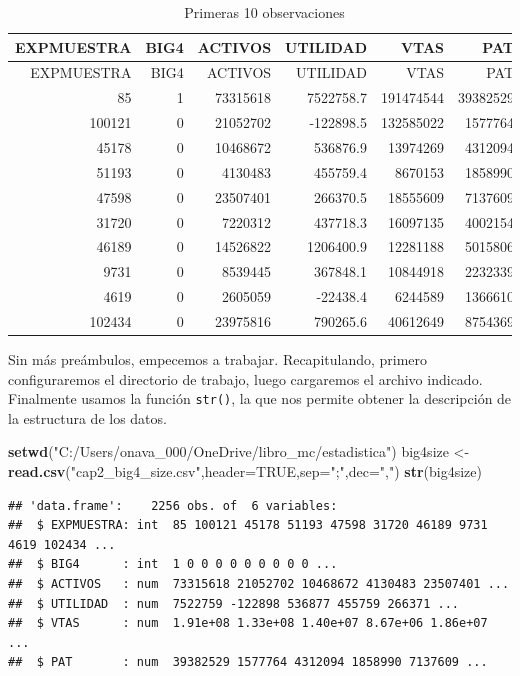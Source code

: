 \documentclass[]{book}
\newenvironment{Shaded}{\begin{snugshade}}{\end{snugshade}}
\newcommand{\KeywordTok}[1]{\textcolor[rgb]{0.13,0.29,0.53}{\textbf{#1}}}
\newcommand{\DataTypeTok}[1]{\textcolor[rgb]{0.13,0.29,0.53}{#1}}
\newcommand{\StringTok}[1]{\textcolor[rgb]{0.31,0.60,0.02}{#1}}
\newcommand{\OtherTok}[1]{\textcolor[rgb]{0.56,0.35,0.01}{#1}}
\newcommand{\NormalTok}[1]{#1}
\begin{document}
\begin{longtable}[]{@{}rrrrrr@{}}
\caption{\label{tab:tabla1}Primeras 10 observaciones}\tabularnewline
\toprule
EXPMUESTRA & BIG4 & ACTIVOS & UTILIDAD & VTAS & PAT\tabularnewline
\midrule
\endfirsthead
\toprule
EXPMUESTRA & BIG4 & ACTIVOS & UTILIDAD & VTAS & PAT\tabularnewline
\midrule
\endhead
85 & 1 & 73315618 & 7522758.7 & 191474544 & 39382529\tabularnewline
100121 & 0 & 21052702 & -122898.5 & 132585022 & 1577764\tabularnewline
45178 & 0 & 10468672 & 536876.9 & 13974269 & 4312094\tabularnewline
51193 & 0 & 4130483 & 455759.4 & 8670153 & 1858990\tabularnewline
47598 & 0 & 23507401 & 266370.5 & 18555609 & 7137609\tabularnewline
31720 & 0 & 7220312 & 437718.3 & 16097135 & 4002154\tabularnewline
46189 & 0 & 14526822 & 1206400.9 & 12281188 & 5015806\tabularnewline
9731 & 0 & 8539445 & 367848.1 & 10844918 & 2232339\tabularnewline
4619 & 0 & 2605059 & -22438.4 & 6244589 & 1366610\tabularnewline
102434 & 0 & 23975816 & 790265.6 & 40612649 & 8754369\tabularnewline
\bottomrule
\end{longtable}

Sin más preámbulos, empecemos a trabajar. Recapitulando, primero
configuraremos el directorio de trabajo, luego cargaremos el archivo
indicado. Finalmente usamos la función \texttt{str()}, la que nos
permite obtener la descripción de la estructura de los datos.

\begin{Shaded}
\begin{Highlighting}[]
\KeywordTok{setwd}\NormalTok{(}\StringTok{"C:/Users/onava_000/OneDrive/libro_mc/estadistica"}\NormalTok{)}
\NormalTok{big4size <-}\StringTok{ }\KeywordTok{read.csv}\NormalTok{(}\StringTok{"cap2_big4_size.csv"}\NormalTok{,}\DataTypeTok{header=}\OtherTok{TRUE}\NormalTok{,}\DataTypeTok{sep=}\StringTok{";"}\NormalTok{,}\DataTypeTok{dec=}\StringTok{","}\NormalTok{)}
\KeywordTok{str}\NormalTok{(big4size)}
\end{Highlighting}
\end{Shaded}

\begin{verbatim}
## 'data.frame':    2256 obs. of  6 variables:
##  $ EXPMUESTRA: int  85 100121 45178 51193 47598 31720 46189 9731 4619 102434 ...
##  $ BIG4      : int  1 0 0 0 0 0 0 0 0 0 ...
##  $ ACTIVOS   : num  73315618 21052702 10468672 4130483 23507401 ...
##  $ UTILIDAD  : num  7522759 -122898 536877 455759 266371 ...
##  $ VTAS      : num  1.91e+08 1.33e+08 1.40e+07 8.67e+06 1.86e+07 ...
##  $ PAT       : num  39382529 1577764 4312094 1858990 7137609 ...
\end{verbatim}
\end{document}
